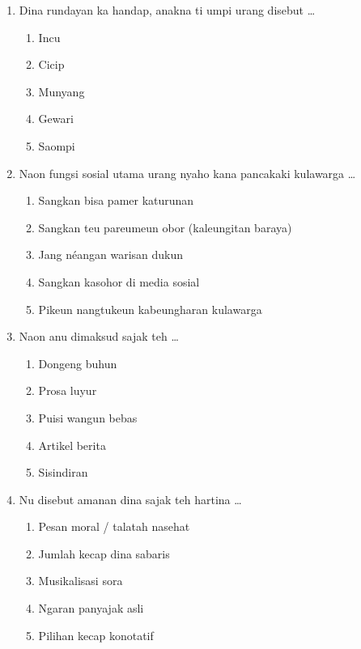 \documentclass[12pt,a4paper]{article}
\begin{document}
\begin{enumerate}[leftmargin=*]
\item Dina rundayan ka handap, anakna ti umpi urang disebut \dots
    \begin{enumerate}[label=\alph*.]
        \item Incu
        \item Cicip
        \item Munyang
        \item Gewari
        \item Saompi
    \end{enumerate}

\item Naon fungsi sosial utama urang nyaho kana pancakaki kulawarga \dots
    \begin{enumerate}[label=\alph*.]
        \item Sangkan bisa pamer katurunan
        \item Sangkan teu pareumeun obor (kaleungitan baraya)
        \item Jang néangan warisan dukun
        \item Sangkan kasohor di media sosial
        \item Pikeun nangtukeun kabeungharan kulawarga
    \end{enumerate}

\item Naon anu dimaksud sajak teh \dots
    \begin{enumerate}[label=\alph*.]
        \item Dongeng buhun
        \item Prosa luyur
        \item Puisi wangun bebas
        \item Artikel berita
        \item Sisindiran
    \end{enumerate}

\item Nu disebut amanan dina sajak teh hartina \dots
    \begin{enumerate}[label=\alph*.]
        \item Pesan moral / talatah nasehat
        \item Jumlah kecap dina sabaris
        \item Musikalisasi sora
        \item Ngaran panyajak asli
        \item Pilihan kecap konotatif
    \end{enumerate}


\end{enumerate}
\end{document}
